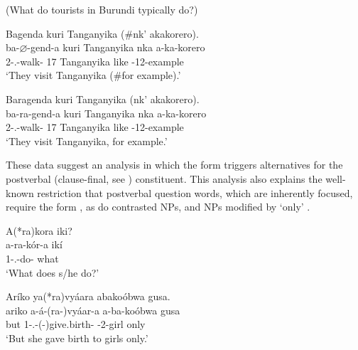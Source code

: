 \documentclass[output=paper]{langscibook}
\begin{document}
\ea
(What do tourists in Burundi typically do?)\\
\ea
\begin{xlist}
\exi{\CJ{}}
\label{bkm:Ref75856545}
Bagenda kuri Tanganyika (\#nk’ akakorero).\\
\gll
ba-$\varnothing$-gend-a  kuri  Tanganyika  nka  a-ka-korero\\
2\SM{}-\PRS.\CJ{}-walk-\FV{}  17  Tanganyika  like  \AUG{}-12-example\\
\glt
‘They visit Tanganyika (\#for example).’\\

\end{xlist}

\ex
\begin{xlist}
\exi{\DJ{}}
Baragenda kuri Tanganyika (nk’ akakorero).\\
\gll
ba-ra-gend-a  kuri  Tanganyika  nka  a-ka-korero\\
2\SM-\PRS.\DJ{}-walk-\FV{}  17  Tanganyika  like  \AUG{}-12-example\\
\glt
‘They visit Tanganyika, for example.’\\

\end{xlist}

\z
\z

These data suggest an analysis in which the \CJ{} form triggers alternatives for the postverbal (clause-final, see ) constituent. This analysis also explains the well-known restriction that postverbal question words, which are inherently focused, require the \CJ{} form , as do contrasted NPs, and NPs modified by ‘only’ .

\ea
\label{bkm:Ref75857421}
A(*ra)kora iki?\\
\gll
a-ra-kór-a  ikí\\
1\SM-\PRS.\DJ{}-do-\FV{}  what\\
\glt
‘What does s/he do?’\\

\z

\ea
\label{bkm:Ref75857415}
Aríko ya(*ra)vyáara abakoóbwa gusa.\\
\gll
ariko  a-á-(ra-)vyáar-a  a-ba-koóbwa  gusa\\
but  1\SM-\RMT.\PST{}-(\DJ{}-)give.birth-\FV{}  \AUG{}-2-girl  only\\
\glt
‘But she gave birth to girls only.’\\
\end{document}

